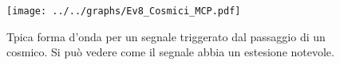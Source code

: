 \begin{figure}[h] \centering \texttt{[image: ../../graphs/Ev8\_Cosmici\_MCP.pdf]}\caption{Tpica forma d'onda per un segnale triggerato dal passaggio di un cosmico. Si può vedere come il segnale abbia un estesione notevole.}\label{gr:Ev8_Cosmici_MCP} \end{figure}
